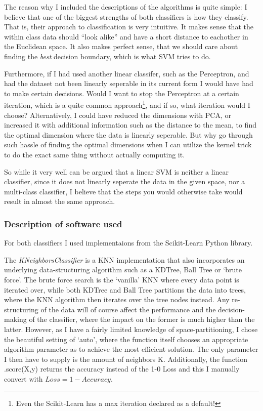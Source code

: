 \documentclass{article}
\theoremstyle{plain}
\theoremstyle{nonumberplain}
\begin{document}
The reason why I included the descriptions of the algorithms is quite simple: I believe that one of the biggest strengths of both classifiers is how they classify. 
That is, their approach to classification is very intuitive.
It makes sense that the within class data should ``look alike'' and have a short distance to eachother in the Euclidean space.
It also makes perfect sense, that we should care about finding the \textit{best} decision boundary, which is what SVM tries to do. 

Furthermore, if I had used another linear classifer, such as the Perceptron, and had the dataset not been linearly seperable in its current form I would have had to make certain decisions.
Would I want to stop the Perceptron at a certain iteration, which is a quite common approach\footnote{Even the Scikit-Learn has a max iteration declared as a default!}, and if so, what iteration would I choose?
Alternatively, I could have reduced the dimensions with PCA, or increased it with additional information such as the distance to the mean, to find the optimal dimension where the data is linearly seperable. 
But why go through such hassle of finding the optimal dimensions when I can utilize the kernel trick to do the exact same thing without actually computing it.

So while it very well can be argued that a linear SVM is neither a linear classifier, since it does not linearly seperate the data in the given space, nor a multi-class classifier, I believe that the steps you would otherwise take would result in almost the same approach. 


\subsubsection{Description of software used}
For both classifiers I used implementaions from the Scikit-Learn Python library\cite{website:sklearn}. \medskip

The \textit{KNeighborsClassifier} is a KNN implementation that also incorporates an underlying data-structuring algorithm such as a KDTree, Ball Tree or `brute force'\cite{website:knn-sklearn}. 
The brute force search is the `vanilla' KNN where every data point is iterated over, while both KDTree and Ball Tree partitions the data into trees, where the KNN algorithm then iterates over the tree nodes instead.
Any re-structuring of the data will of course affect the performance and the decision-making of the classifier, where the impact on the former is much higher than the latter. 
However, as I have a fairly limited knowledge of space-partitioning, I chose the beautiful setting of `auto', where the function itself chooses an appropriate algorithm parameter as to achieve the most efficient solution. The only parameter I then have to supply is the amount of neighbors K. Additionally, the function .score(X,y) returns the accuracy instead of the 1-0 Loss and this I manually convert with $Loss = 1 - Accuracy$. \medskip
\end{document}
